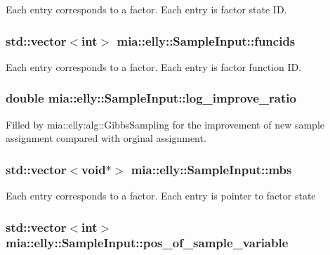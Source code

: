Each entry corresponds to a factor. Each entry is factor state I\-D. \hypertarget{classmia_1_1elly_1_1_sample_input_a1d6d5dd5a873392951ead77fbd08bfa0}{
\subsubsection[{funcids}]{\setlength{\rightskip}{0pt plus 5cm}std\-::vector$<$int$>$ mia\-::elly\-::\-Sample\-Input\-::funcids}}\label{classmia_1_1elly_1_1_sample_input_a1d6d5dd5a873392951ead77fbd08bfa0}
Each entry corresponds to a factor. Each entry is factor function I\-D. \hypertarget{classmia_1_1elly_1_1_sample_input_a0016cf98d8b1a50f42a5b85e091e61f9}{
\subsubsection[{log\-\_\-improve\-\_\-ratio}]{\setlength{\rightskip}{0pt plus 5cm}double mia\-::elly\-::\-Sample\-Input\-::log\-\_\-improve\-\_\-ratio}}\label{classmia_1_1elly_1_1_sample_input_a0016cf98d8b1a50f42a5b85e091e61f9}
Filled by mia\-::elly\-:alg\-:\-:Gibbs\-Sampling for the improvement of new sample assignment compared with orginal assignment. \hypertarget{classmia_1_1elly_1_1_sample_input_a90a8ec0276ef33d9b540088e920590b3}{
\subsubsection[{mbs}]{\setlength{\rightskip}{0pt plus 5cm}std\-::vector$<$void$\ast$$>$ mia\-::elly\-::\-Sample\-Input\-::mbs}}\label{classmia_1_1elly_1_1_sample_input_a90a8ec0276ef33d9b540088e920590b3}
Each entry corresponds to a factor. Each entry is pointer to factor state \hypertarget{classmia_1_1elly_1_1_sample_input_a88663ca6f136010fe91e6459314269da}{
\subsubsection[{pos\-\_\-of\-\_\-sample\-\_\-variable}]{\setlength{\rightskip}{0pt plus 5cm}std\-::vector$<$int$>$ mia\-::elly\-::\-Sample\-Input\-::pos\-\_\-of\-\_\-sample\-\_\-variable}}\label{classmia_1_1elly_1_1_sample_input_a88663ca6f136010fe91e6459314269da}
